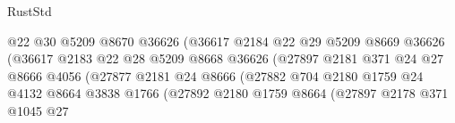 \begin{lexlean}{RustStd}
\begin{coremodule}
                                          @22
                                          @30
                                          @5209
                                          @8670
                                          @36626
                                          (@36617
                                            @2184
                                            @22
                                            @29
                                            @5209
                                            @8669
                                            @36626
                                            (@36617
                                              @2183
                                              @22
                                              @28
                                              @5209
                                              @8668
                                              @36626
                                              (@27897
                                                @2181
                                                @371
                                                @24
                                                @27
                                                @8666
                                                @4056
                                                (@27877
                                                  @2181
                                                  @24
                                                  @8666
                                                  (@27882
                                                    @704
                                                    @2180
                                                    @1759
                                                    @24
                                                    @4132
                                                    @8664
                                                    @3838
                                                    @1766
                                                    (@27892
                                                      @2180
                                                      @1759
                                                      @8664
                                                      (@27897
                                                        @2178
                                                        @371
                                                        @1045
                                                        @27

\end{coremodule}
\end{lexlean}
